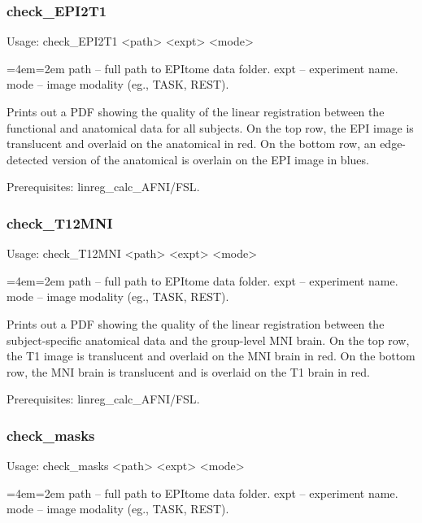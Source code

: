 \documentclass[final,titlepage,letterpaper,oneside,12pt]{article}
\renewcommand{\texttt}[2][BrickRed]{\textcolor{#1}{\ttfamily #2}}%
\newenvironment{blockquote}{%
  \par%
  \medskip
  \leftskip=4em\rightskip=2em%
  \noindent\ignorespaces}{%
  \par\medskip}
\begin{document}
\subsubsection{check\_EPI2T1}
Usage: \texttt{check\_EPI2T1 <path> <expt> <mode>}

\begin{blockquote}
path -- full path to EPItome data folder.
expt -- experiment name.
mode -- image modality (eg., TASK, REST).
\end{blockquote}

\noindent Prints out a PDF showing the quality of the linear registration between the functional and anatomical data for all subjects. On the top row, the EPI image is translucent and overlaid on the anatomical in red. On the bottom row, an edge-detected version of the anatomical is overlain on the EPI image in blues.

Prerequisites: \texttt{linreg\_calc\_AFNI/FSL}.

\subsubsection{check\_T12MNI}
Usage: \texttt{check\_T12MNI <path> <expt> <mode>}

\begin{blockquote}
path -- full path to EPItome data folder.
expt -- experiment name.
mode -- image modality (eg., TASK, REST).
\end{blockquote}

\noindent Prints out a PDF showing the quality of the linear registration between the subject-specific anatomical data and the group-level MNI brain. On the top row, the T1 image is translucent and overlaid on the MNI brain in red. On the bottom row, the MNI brain is translucent and is overlaid on the T1 brain in red.

Prerequisites: \texttt{linreg\_calc\_AFNI/FSL}.

\subsubsection{check\_masks}
Usage: \texttt{check\_masks <path> <expt> <mode>}

\begin{blockquote}
path -- full path to EPItome data folder.
expt -- experiment name.
mode -- image modality (eg., TASK, REST).
\end{blockquote}
\end{document}
